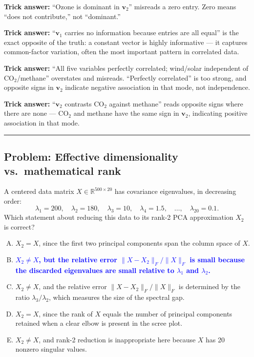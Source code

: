 \documentclass[12pt]{amsart}
\newcommand{\divider}{
  \vspace{-1em}
  \noindent
  \raisebox{-0.15ex}{\textbullet}%
  \hspace{0.5em}%
  \rule[0.5ex]{0.95\textwidth}{1.0pt}%
  \hspace{0.5em}%
  \raisebox{-0.15ex}{\textbullet}%
  \vspace{0em}
}
\begin{document}
\textbf{Trick answer:}
``Ozone is dominant in $\mathbf{v}_2$'' misreads a zero entry. Zero means ``does
not contribute,'' not ``dominant.''

\textbf{Trick answer:}
``$\mathbf{v}_1$ carries no information because entries are all equal'' is the
exact opposite of the truth: a constant vector is highly informative ---
it captures common-factor variation, often the most important pattern in
correlated data.

\textbf{Trick answer:}
``All five variables perfectly correlated; wind/solar independent of CO$_2$/methane''
overstates and misreads. ``Perfectly correlated'' is too strong, and opposite
signs in $\mathbf{v}_2$ indicate negative association in that mode, not
independence.

\textbf{Trick answer:}
``$\mathbf{v}_2$ contrasts $\mathrm{CO}_2$ against methane'' reads opposite
signs where there are none --- $\mathrm{CO}_2$ and methane have the same
sign in $\mathbf{v}_2$, indicating positive association in that mode.

\divider

\subsection*{Problem: Effective dimensionality vs.\ mathematical rank}

A centered data matrix $X \in \mathbb{R}^{500 \times 20}$ has covariance
eigenvalues, in decreasing order:
$$\lambda_1 = 200, \quad \lambda_2 = 180, \quad \lambda_3 = 10,
\quad \lambda_4 = 1.5, \quad \ldots, \quad \lambda_{20} = 0.1.$$
Which statement about reducing this data to its rank-2 PCA approximation
$X_2$ is correct?

\begin{enumerate}[(A)]
\item $X_2 = X$, since the first two principal components span the column space of $X$.
\item \textcolor{blue}{\textbf{$X_2 \neq X$, but the relative error $\|X - X_2\|_F / \|X\|_F$ is small because the discarded eigenvalues are small relative to $\lambda_1$ and $\lambda_2$.}}
\item $X_2 \neq X$, and the relative error $\|X - X_2\|_F / \|X\|_F$ is determined
by the ratio $\lambda_3/\lambda_2$, which measures the size of the spectral gap.
\item $X_2 = X$, since the rank of $X$ equals the number of principal components
retained when a clear elbow is present in the scree plot.
\item $X_2 \neq X$, and rank-2 reduction is inappropriate here because $X$ has
20 nonzero singular values.
\end{enumerate}
\end{document}
